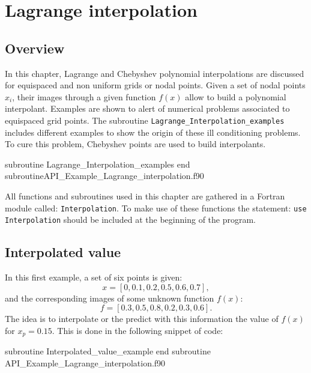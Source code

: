 
    
 \chapter{Lagrange interpolation   }\label{chap:lagrange_interpolant}


\section{Overview} 
 In this chapter,  Lagrange and Chebyshev polynomial interpolations are discussed for equispaced and non uniform grids or nodal points. Given a  set of nodal points $ x_i$, their images through a given function $f(x)$ allow to build a polynomial interpolant. Examples are shown to alert of numerical problems associated to equispaced grid points.  
 The subroutine \verb|Lagrange_Interpolation_examples| includes different examples to show the origin of these ill conditioning problems. 
 To cure this problem, Chebyshev points are used to build interpolants. 

\vspace{0.5cm} 
         {subroutine Lagrange_Interpolation_examples}
         {end subroutine}{API_Example_Lagrange_interpolation.f90}
 
All functions and subroutines used in this chapter are gathered in a Fortran module 
called: \verb|Interpolation|. To make use of these functions the statement: 
\verb|use Interpolation|
should be included at the beginning of the program.


\section{Interpolated value} 

In this first example, a set of six points is given: 
$$
   {x} = [ 0, 0.1, 0.2, 0.5, 0.6, 0.7 ],
$$
and the corresponding images of some unknown function $ f(x) $: 
$$
{f} = [ 0.3, 0.5, 0.8, 0.2, 0.3, 0.6 ].
$$
The idea is to interpolate or the predict with this information the value of
$ f(x) $ for $ x_p = 0.15 $. 
This is done in the following snippet of code:

\vspace{0.5cm} 
		 {subroutine Interpolated_value_example}
         {end subroutine}
         {API_Example_Lagrange_interpolation.f90}

